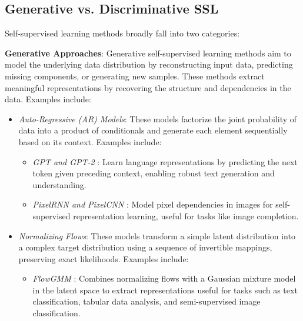\subsection{Generative vs. Discriminative SSL}


Self-supervised learning methods broadly fall into two categories:

\textbf{Generative Approaches}: Generative self-supervised learning methods aim to model the underlying data distribution by reconstructing input data, predicting missing components, or generating new samples. These methods extract meaningful representations by recovering the structure and dependencies in the data. Examples include:

\begin{itemize}
    \item \emph{Auto-Regressive (AR) Models}: These models factorize the joint probability of data into a product of conditionals and generate each element sequentially based on its context. Examples include:
    \begin{itemize}
        \item \emph{GPT and GPT-2} \citep{radford2019language}: Learn language representations by predicting the next token given preceding context, enabling robust text generation and understanding.
        \item \emph{PixelRNN and PixelCNN} \citep{oord2016pixel}: Model pixel dependencies in images for self-supervised representation learning, useful for tasks like image completion.
    \end{itemize}



\item \emph{Normalizing Flows}: These models transform a simple latent distribution into a complex target distribution using a sequence of invertible mappings, preserving exact likelihoods. Examples include:
\begin{itemize}
    \item \emph{FlowGMM} \citep{izmailov2021flowgmm}: Combines normalizing flows with a Gaussian mixture model in the latent space to extract representations useful for tasks such as text classification, tabular data analysis, and semi-supervised image classification.
\end{itemize}


\end{itemize}
